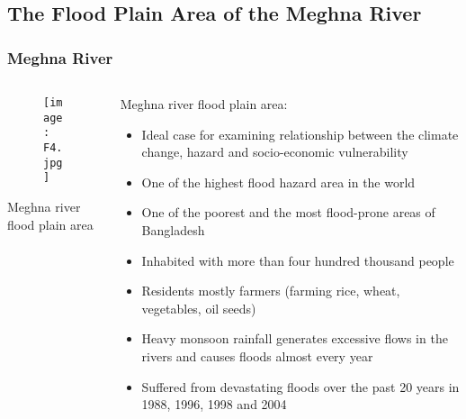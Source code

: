 \documentclass[pdflatex,compress,8pt,
	xcolor={dvipsnames,dvipsnames,svgnames,x11names,table},
	hyperref={colorlinks = true,breaklinks = true, urlcolor = NavyBlue, breaklinks = true}]{beamer}
\begin{document}
\subsection{The Flood Plain Area of the Meghna River}
\begin{frame}\frametitle{Meghna River}
\begin{minipage}[0.4\textheight]{\textwidth}
\begin{columns}[T]
\begin{column}{0.5\textwidth}
\vspace{2em}
\begin{figure}[H]
	\centering
		\texttt{[image: F4.jpg]}
\end{figure}
\footnotesize{Meghna river flood plain area}
\end{column}
\begin{column}{0.5\textwidth}
\vspace{2em} 
Meghna river flood plain area: 
\small{\begin{itemize}
	\item Ideal case for examining relationship between the climate change, hazard and socio-economic vulnerability
	\item One of the highest flood hazard area in the world
	\item One of the poorest and the most flood-prone areas of Bangladesh
	\item Inhabited with more than four hundred thousand people
	\item Residents mostly farmers (farming rice, wheat, vegetables, oil seeds)
	\item Heavy monsoon rainfall generates excessive flows in the rivers and causes floods almost every year
	\item Suffered from devastating floods over the past 20 years in 1988, 1996, 1998 and 2004
\end{itemize}}
\end{column}
\end{columns}
\end{minipage}
\end{frame}
	
\end{document}
